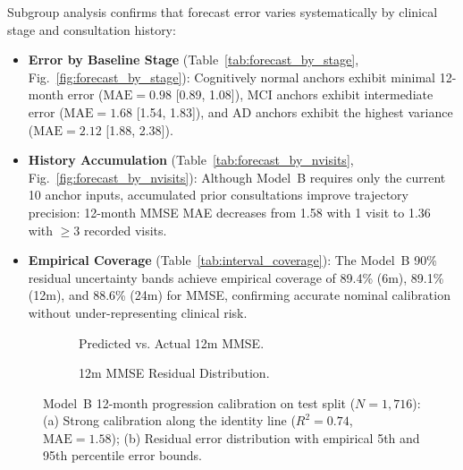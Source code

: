 \documentclass[11pt,a4paper]{article}
\begin{document}




Subgroup analysis confirms that forecast error varies systematically by clinical stage and consultation history:
\begin{itemize}
    \item \textbf{Error by Baseline Stage} (Table~\ref{tab:forecast_by_stage}, Fig.~\ref{fig:forecast_by_stage}): Cognitively normal anchors exhibit minimal 12-month error ($\text{MAE} = 0.98$ [0.89, 1.08]), MCI anchors exhibit intermediate error ($\text{MAE} = 1.68$ [1.54, 1.83]), and AD anchors exhibit the highest variance ($\text{MAE} = 2.12$ [1.88, 2.38]).
    \item \textbf{History Accumulation} (Table~\ref{tab:forecast_by_nvisits}, Fig.~\ref{fig:forecast_by_nvisits}): Although Model~B requires only the current 10 anchor inputs, accumulated prior consultations improve trajectory precision: 12-month MMSE MAE decreases from 1.58 with 1 visit to 1.36 with $\ge 3$ recorded visits.
    \item \textbf{Empirical Coverage} (Table~\ref{tab:interval_coverage}): The Model~B 90\% residual uncertainty bands achieve empirical coverage of 89.4\% (6m), 89.1\% (12m), and 88.6\% (24m) for MMSE, confirming accurate nominal calibration without under-representing clinical risk.
\end{itemize}

\begin{figure}[t]
\centering
\begin{subfigure}[t]{0.48\linewidth}
    \centering
    \caption{Predicted vs. Actual 12m MMSE.}
    \label{fig:pred_vs_actual_mmse12}
\end{subfigure}
\hfill
\begin{subfigure}[t]{0.48\linewidth}
    \centering
    \caption{12m MMSE Residual Distribution.}
    \label{fig:residual_hist_mmse12}
\end{subfigure}
\caption{Model~B 12-month progression calibration on test split ($N = 1,716$): (a) Strong calibration along the identity line ($R^2 = 0.74$, $\text{MAE} = 1.58$); (b) Residual error distribution with empirical 5th and 95th percentile error bounds.}
\label{fig:calibration_scatter_hist}
\end{figure}
\end{document}

